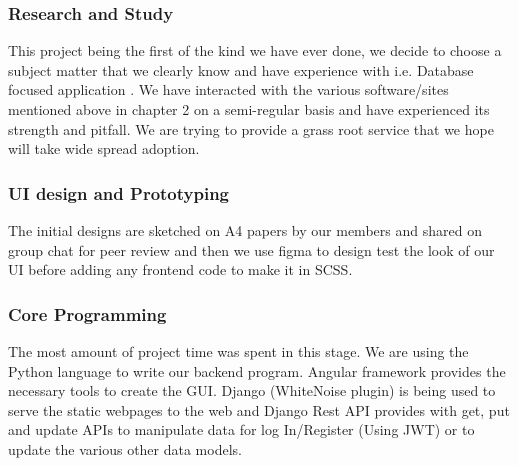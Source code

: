 \documentclass[12pt]{article}
\begin{document}
\subsubsection{Research and Study}
This project being the first of the kind we have ever done, we decide to choose a subject matter that we clearly know and have experience with i.e. Database focused application . We have interacted with the various software/sites mentioned above in chapter 2 on a semi-regular basis and have experienced its strength 
and pitfall. We are trying to provide a grass root service that we hope will take wide spread adoption.

\subsubsection{UI design and Prototyping}
The initial designs are sketched on A4 papers by our members and shared on group chat for peer review and then we use figma to design test the look of our UI before adding any frontend code to make it in SCSS.

\subsubsection{Core Programming}
The most amount of project time was  spent in this stage. We are using the Python language to write our backend program. Angular framework provides the necessary tools to create the GUI. Django (WhiteNoise plugin) is being used to serve the static webpages to the web and Django Rest API provides with get, put and update APIs to manipulate data for log In/Register (Using JWT) or to update the various other data models.
\end{document}
